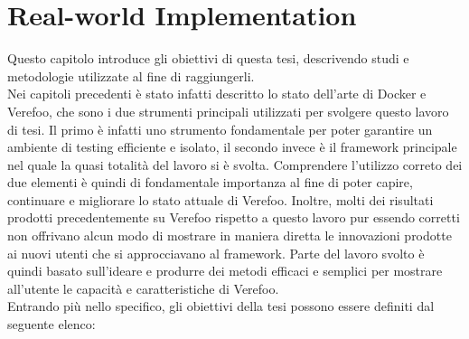 \chapter{Real-world Implementation} \label{ch:Real-worldImplementation}

Questo capitolo introduce gli obiettivi di questa tesi, descrivendo studi e metodologie utilizzate al fine di raggiungerli.\\
Nei capitoli precedenti è stato infatti descritto lo stato dell'arte di Docker e Verefoo, che sono i due strumenti principali utilizzati per
svolgere questo lavoro di tesi. Il primo è infatti uno strumento fondamentale per poter garantire un ambiente di testing efficiente e isolato, il secondo
invece è il framework principale nel quale la quasi totalità del lavoro si è svolta. Comprendere l'utilizzo correto dei due elementi è quindi di fondamentale importanza al fine di 
poter capire, continuare e migliorare lo stato attuale di Verefoo. Inoltre, molti dei risultati prodotti precedentemente su Verefoo rispetto a questo lavoro pur essendo corretti non
offrivano alcun modo di mostrare in maniera diretta le innovazioni prodotte ai nuovi utenti che si approcciavano al framework. Parte del lavoro svolto è quindi basato sull'ideare e produrre
dei metodi efficaci e semplici per mostrare all'utente le capacità e caratteristiche di Verefoo.\\
Entrando più nello specifico, gli obiettivi della tesi possono essere definiti dal seguente elenco:


